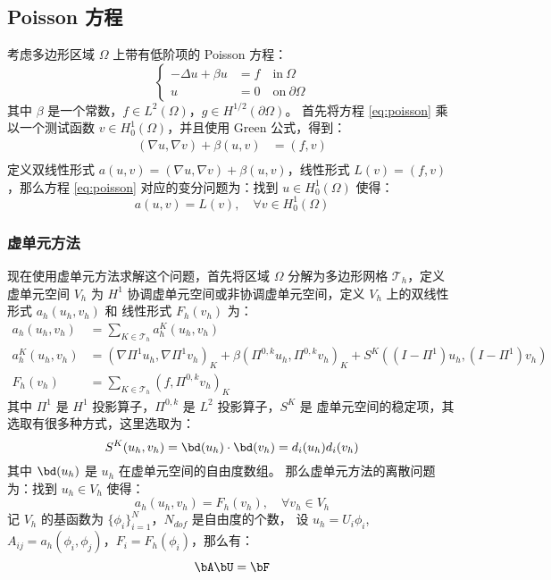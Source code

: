 \subsection{Poisson 方程}
考虑多边形区域 $\Omega$ 上带有低阶项的 Poisson 方程：
\begin{equation}
    \label{eq:poisson}
    \left\{
    \begin{aligned}
        -\Delta u +\beta u& = f \quad \text{in} \ \Omega\\
        u & = 0 \quad \text{on} \ \partial \Omega
    \end{aligned}
\right.
\end{equation}
其中 $\beta$ 是一个常数，$f \in L^2(\Omega)$，$g \in H^{1/2}(\partial \Omega)$。
首先将方程 \eqref{eq:poisson} 乘以一个测试函数 $v \in H^1_0(\Omega)$，并且使用
Green 公式，得到：
$$
\begin{aligned}
    (\nabla u, \nabla v) + \beta(u, v) & = (f, v)\\
\end{aligned}
$$
定义双线性形式 $a(u, v) = (\nabla u, \nabla v) + \beta(u, v)$，线性形式
$L(v) = (f, v)$，那么方程 \eqref{eq:poisson} 对应的变分问题为：找到 $u \in
H^1_0(\Omega)$ 使得：
$$
a(u, v) = L(v), \quad \forall v \in H^1_0(\Omega)
$$
\subsubsection{虚单元方法}
现在使用虚单元方法求解这个问题，首先将区域 $\Omega$ 分解为多边形网格
$\mathcal{T}_h$，定义虚单元空间 $V_h$ 为 $H^1$
协调虚单元空间或非协调虚单元空间，定义 $V_h$ 上的双线性形式 $a_h(u_h, v_h)$ 和
线性形式 $F_h(v_h)$ 为：
$$
\begin{aligned}
    a_h(u_h, v_h) & = \sum_{K \in \mathcal{T}_h}a_h^K(u_h, v_h)\\
    a_h^K(u_h, v_h) & = (\nabla \Pi^{1}u_h, \nabla \Pi^1 v_h)_K +
    \beta(\Pi^{0,k}u_h,
    \Pi^{0, k}v_h)_K + S^K((I-\Pi^1)u_h, (I-\Pi^1)v_h)\\
    F_h(v_h) & = \sum_{K\in \mathcal{T}_h}(f, \Pi^{0, k}v_h)_K
\end{aligned}
$$
其中 $\Pi^1$ 是 $H^1$ 投影算子，$\Pi^{0, k}$ 是 $L^2$ 投影算子，$S^K$ 是
虚单元空间的稳定项，其选取有很多种方式，这里选取为：
$$
S^K(u_h, v_h) = \bd(u_h)\cdot \bd(v_h) = d_i(u_h)d_i(v_h)
$$
其中 $\bd(u_h)$ 是 $u_h$ 在虚单元空间的自由度数组。
那么虚单元方法的离散问题为：找到 $u_h \in V_h$ 使得：
$$
a_h(u_h, v_h) = F_h(v_h), \quad \forall v_h \in V_h
$$
记 $V_h$ 的基函数为 $\{\phi_i\}_{i=1}^{N}$，$N_{dof}$ 是自由度的个数，
设 $u_h = U_i \phi_i$, $A_{ij} = a_h(\phi_i, \phi_j)$，$F_i = F_h(\phi_i)$，那么有：
$$
\bA \bU = \bF
$$
